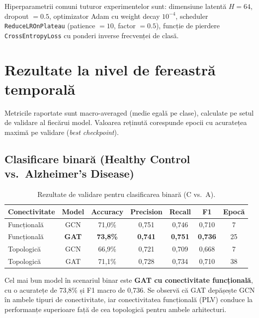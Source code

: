\documentclass[12pt,a4paper]{report}
\theoremstyle{definition}
\theoremstyle{remark}
\begin{document}
Hiperparametrii comuni tuturor experimentelor sunt: dimensiune latentă $H = 64$,
dropout $= 0.5$, optimizator Adam cu weight decay $10^{-4}$, scheduler
\texttt{ReduceLROnPlateau} (patience $= 10$, factor $= 0.5$), funcție de pierdere
\texttt{CrossEntropyLoss} cu ponderi inverse frecvenței de clasă.

\section{Rezultate la nivel de fereastră temporală}
\label{sec:rezultate_fereastra}

Metricile raportate sunt macro-averaged (medie egală pe clase), calculate pe setul de
validare al fiecărui model. Valoarea reținută corespunde epocii cu acuratețea maximă pe
validare (\textit{best checkpoint}).

\subsection{Clasificare binară (Healthy Control vs.\ Alzheimer's Disease)}

\begin{table}[H]
    \centering
    \caption{Rezultate de validare pentru clasificarea binară (C vs.\ A).}
    \label{tab:rezultate_binar}
    \begin{tabular}{|l|c|c|c|c|c|c|}
        \hline
        \textbf{Conectivitate} & \textbf{Model} & \textbf{Accuracy} & \textbf{Precision} & \textbf{Recall} & \textbf{F1} & \textbf{Epocă} \\
        \hline
        Funcțională & GCN   & 71,0\% & 0,751 & 0,746 & 0,710 & 7  \\
        Funcțională & \textbf{GAT} & \textbf{73,8\%} & \textbf{0,741} & \textbf{0,751} & \textbf{0,736} & 25 \\
        Topologică  & GCN   & 66,9\% & 0,721 & 0,709 & 0,668 & 7  \\
        Topologică  & GAT   & 71,1\% & 0,728 & 0,734 & 0,710 & 38 \\
        \hline
    \end{tabular}
\end{table}

Cel mai bun model în scenariul binar este \textbf{GAT cu conectivitate funcțională},
cu o acuratețe de 73,8\% și F1 macro de 0,736. Se observă că GAT depășește GCN în
ambele tipuri de conectivitate, iar conectivitatea funcțională (PLV) conduce la
performanțe superioare față de cea topologică pentru ambele arhitecturi.
\end{document}
